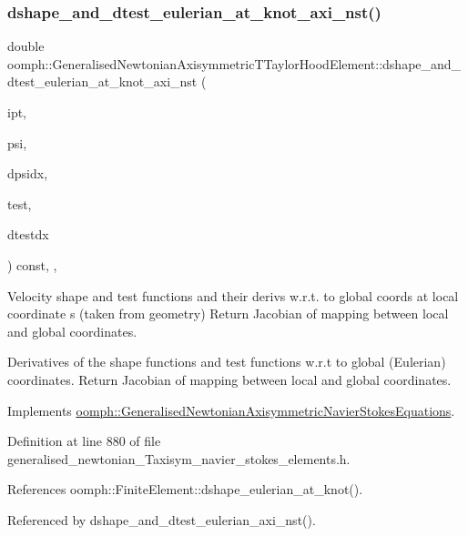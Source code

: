 \subsubsection{\texorpdfstring{dshape\+\_\+and\+\_\+dtest\+\_\+eulerian\+\_\+at\+\_\+knot\+\_\+axi\+\_\+nst()}{dshape\_and\_dtest\_eulerian\_at\_knot\_axi\_nst()}\hspace{0.1cm}{\footnotesize\ttfamily [1/2]}}
{\footnotesize\ttfamily double oomph\+::\+Generalised\+Newtonian\+Axisymmetric\+T\+Taylor\+Hood\+Element\+::dshape\+\_\+and\+\_\+dtest\+\_\+eulerian\+\_\+at\+\_\+knot\+\_\+axi\+\_\+nst (\begin{DoxyParamCaption}\item[{const unsigned \&}]{ipt,  }\item[{\hyperlink{classoomph_1_1Shape}{Shape} \&}]{psi,  }\item[{\hyperlink{classoomph_1_1DShape}{D\+Shape} \&}]{dpsidx,  }\item[{\hyperlink{classoomph_1_1Shape}{Shape} \&}]{test,  }\item[{\hyperlink{classoomph_1_1DShape}{D\+Shape} \&}]{dtestdx }\end{DoxyParamCaption}) const\hspace{0.3cm}{\ttfamily [inline]}, {\ttfamily [protected]}, {\ttfamily [virtual]}}



Velocity shape and test functions and their derivs w.\+r.\+t. to global coords at local coordinate s (taken from geometry) Return Jacobian of mapping between local and global coordinates. 

Derivatives of the shape functions and test functions w.\+r.\+t to global (Eulerian) coordinates. Return Jacobian of mapping between local and global coordinates. 

Implements \hyperlink{classoomph_1_1GeneralisedNewtonianAxisymmetricNavierStokesEquations_aea547f513386ed96746cbf55f70d6f78}{oomph\+::\+Generalised\+Newtonian\+Axisymmetric\+Navier\+Stokes\+Equations}.



Definition at line 880 of file generalised\+\_\+newtonian\+\_\+\+Taxisym\+\_\+navier\+\_\+stokes\+\_\+elements.\+h.



References oomph\+::\+Finite\+Element\+::dshape\+\_\+eulerian\+\_\+at\+\_\+knot().



Referenced by dshape\+\_\+and\+\_\+dtest\+\_\+eulerian\+\_\+axi\+\_\+nst().

